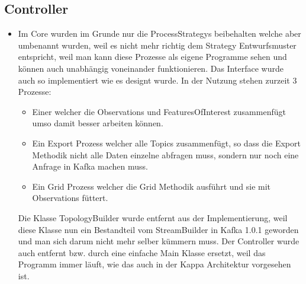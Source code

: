 \subsection{Controller}
\begin{itemize}
	\item Im Core wurden im Grunde nur die ProcessStrategys beibehalten welche aber umbenannt wurden, weil es nicht mehr richtig dem Strategy Entwurfsmuster entspricht, weil man kann diese Prozesse als eigene Programme sehen und können auch unabhängig voneinander funktionieren. Das Interface wurde auch so implementiert wie es designt wurde. In der Nutzung stehen zurzeit 3 Prozesse:
	\begin{itemize}
		\item Einer welcher die Observations und FeaturesOfInterest zusammenfügt umso damit besser arbeiten können.
		\item Ein Export Prozess welcher alle Topics zusammenfügt, so dass die Export Methodik nicht alle Daten einzelne abfragen muss, sondern nur noch eine Anfrage in Kafka machen muss.
		\item Ein Grid Prozess welcher die Grid Methodik ausführt und sie mit Observations füttert.
	\end{itemize}
	Die Klasse TopologyBuilder wurde entfernt aus der Implementierung, weil diese Klasse nun ein Bestandteil vom StreamBuilder in Kafka 1.0.1 geworden und man sich darum nicht mehr selber kümmern muss.
	Der Controller wurde auch entfernt bzw. durch eine einfache Main Klasse ersetzt, weil das Programm immer läuft, wie das auch in der Kappa Architektur vorgesehen ist.
\end{itemize}

